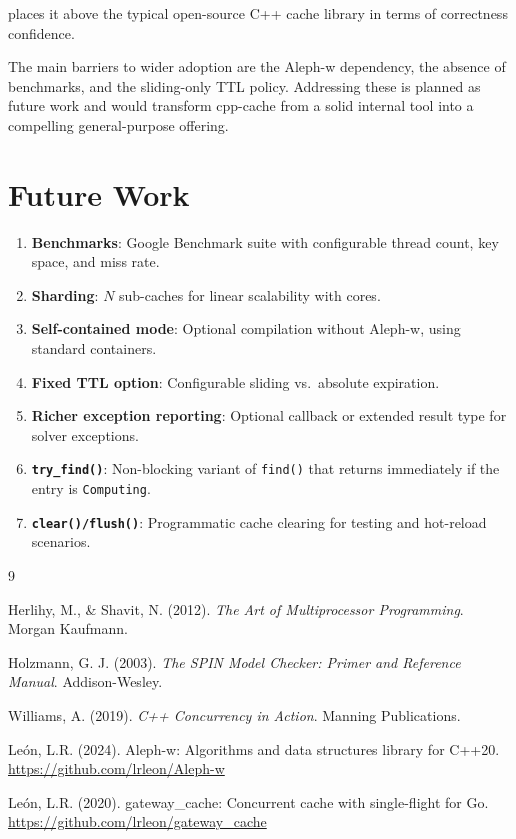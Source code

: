 \documentclass[11pt,a4paper]{article}
\begin{document}
\noindent places it above the typical open-source C++ cache library in
terms of correctness confidence.

The main barriers to wider adoption are the Aleph-w dependency, the
absence of benchmarks, and the sliding-only TTL policy.  Addressing
these is planned as future work and would transform cpp-cache from a
solid internal tool into a compelling general-purpose offering.

\section{Future Work}

\begin{enumerate}
\item \textbf{Benchmarks}: Google Benchmark suite with configurable
      thread count, key space, and miss rate.
\item \textbf{Sharding}: $N$ sub-caches for linear scalability with
      cores.
\item \textbf{Self-contained mode}: Optional compilation without
      Aleph-w, using standard containers.
\item \textbf{Fixed TTL option}: Configurable sliding vs.\ absolute
      expiration.
\item \textbf{Richer exception reporting}: Optional callback or
      extended result type for solver exceptions.
\item \textbf{\texttt{try\_find()}}: Non-blocking variant of
      \texttt{find()} that returns immediately if the entry is
      \texttt{Computing}.
\item \textbf{\texttt{clear()/flush()}}: Programmatic cache clearing
      for testing and hot-reload scenarios.
\end{enumerate}

\begin{thebibliography}{9}

  Herlihy, M., \& Shavit, N. (2012).
  \emph{The Art of Multiprocessor Programming}.
  Morgan Kaufmann.

  Holzmann, G. J. (2003).
  \emph{The SPIN Model Checker: Primer and Reference Manual}.
  Addison-Wesley.

  Williams, A. (2019).
  \emph{C++ Concurrency in Action}.
  Manning Publications.

  Le\'{o}n, L.R. (2024).
  Aleph-w: Algorithms and data structures library for C++20.
  \url{https://github.com/lrleon/Aleph-w}

  Le\'{o}n, L.R. (2020).
  gateway\_cache: Concurrent cache with single-flight for Go.
  \url{https://github.com/lrleon/gateway_cache}

\end{thebibliography}
\end{document}
